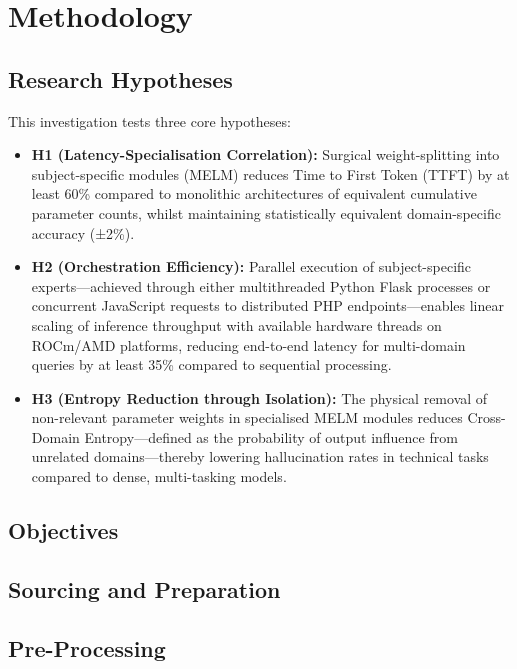\documentclass[conference]{IEEEtran}
\begin{document}
\section{Methodology}
	\subsection{Research Hypotheses}
		This investigation tests three core hypotheses:

		\begin{itemize}
			\item \textbf{H1 (Latency-Specialisation Correlation):} Surgical weight-splitting into subject-specific modules (MELM) reduces Time to First Token (TTFT) by at least 60\% compared to monolithic architectures of equivalent cumulative parameter counts, whilst maintaining statistically equivalent domain-specific accuracy (±2\%).

			\item \textbf{H2 (Orchestration Efficiency):} Parallel execution of subject-specific experts—achieved through either multithreaded Python Flask processes or concurrent JavaScript requests to distributed PHP endpoints—enables linear scaling of inference throughput with available hardware threads on ROCm/AMD platforms, reducing end-to-end latency for multi-domain queries by at least 35\% compared to sequential processing.

			\item \textbf{H3 (Entropy Reduction through Isolation):} The physical removal of non-relevant parameter weights in specialised MELM modules reduces Cross-Domain Entropy—defined as the probability of output influence from unrelated domains—thereby lowering hallucination rates in technical tasks compared to dense, multi-tasking models.
		\end{itemize}

	\subsection{Objectives}

	\subsection{Sourcing and Preparation}

	\subsection{Pre-Processing}
	\label{subsec:preprocessing}
\end{document}
